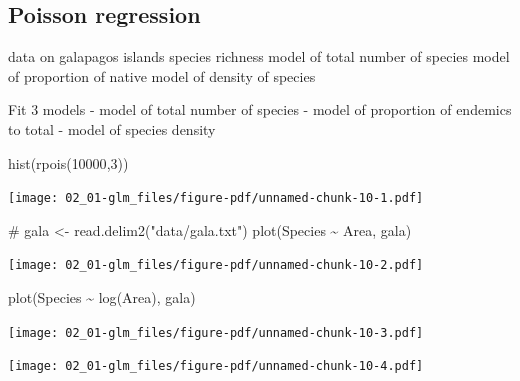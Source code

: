 \documentclass[
  letterpaper,
  DIV=11,
  numbers=noendperiod]{scrreprt}
\newenvironment{Shaded}{\begin{snugshade}}{\end{snugshade}}
\newcommand{\CommentTok}[1]{\textcolor[rgb]{0.37,0.37,0.37}{#1}}
\newcommand{\DecValTok}[1]{\textcolor[rgb]{0.68,0.00,0.00}{#1}}
\newcommand{\FunctionTok}[1]{\textcolor[rgb]{0.28,0.35,0.67}{#1}}
\newcommand{\NormalTok}[1]{\textcolor[rgb]{0.00,0.23,0.31}{#1}}
\newcommand{\OtherTok}[1]{\textcolor[rgb]{0.00,0.23,0.31}{#1}}
\newcommand{\SpecialCharTok}[1]{\textcolor[rgb]{0.37,0.37,0.37}{#1}}
\newcommand{\StringTok}[1]{\textcolor[rgb]{0.13,0.47,0.30}{#1}}
\begin{document}
\subsection{Poisson regression}\label{poisson-regression}

data on galapagos islands species richness model of total number of
species model of proportion of native model of density of species

Fit 3 models - model of total number of species - model of proportion of
endemics to total - model of species density

\begin{Shaded}
\begin{Highlighting}[]
  \FunctionTok{hist}\NormalTok{(}\FunctionTok{rpois}\NormalTok{(}\DecValTok{10000}\NormalTok{,}\DecValTok{3}\NormalTok{))}
\end{Highlighting}
\end{Shaded}

\texttt{[image: 02\_01-glm\_files/figure-pdf/unnamed-chunk-10-1.pdf]}

\begin{Shaded}
\begin{Highlighting}[]
\CommentTok{\#}
\NormalTok{ gala }\OtherTok{\textless{}{-}} \FunctionTok{read.delim2}\NormalTok{(}\StringTok{"data/gala.txt"}\NormalTok{)}
 \FunctionTok{plot}\NormalTok{(Species }\SpecialCharTok{\textasciitilde{}}\NormalTok{ Area, gala)}
\end{Highlighting}
\end{Shaded}

\texttt{[image: 02\_01-glm\_files/figure-pdf/unnamed-chunk-10-2.pdf]}

\begin{Shaded}
\begin{Highlighting}[]
 \FunctionTok{plot}\NormalTok{(Species }\SpecialCharTok{\textasciitilde{}} \FunctionTok{log}\NormalTok{(Area), gala)}
\end{Highlighting}
\end{Shaded}

\texttt{[image: 02\_01-glm\_files/figure-pdf/unnamed-chunk-10-3.pdf]}

\begin{Shaded}
\end{Shaded}

\texttt{[image: 02\_01-glm\_files/figure-pdf/unnamed-chunk-10-4.pdf]}
\end{document}
